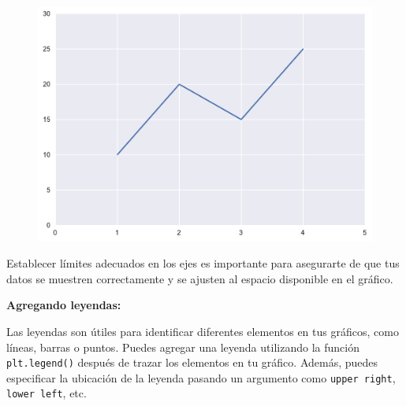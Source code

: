 \documentclass[
  a4paper,
]{article}
\begin{document}
\begin{figure}[H]

{\centering \includegraphics{index_files/figure-pdf/cell-11-output-1.pdf}

}

\end{figure}

Establecer límites adecuados en los ejes es importante para asegurarte
de que tus datos se muestren correctamente y se ajusten al espacio
disponible en el gráfico.

\textbf{Agregando leyendas:}

Las leyendas son útiles para identificar diferentes elementos en tus
gráficos, como líneas, barras o puntos. Puedes agregar una leyenda
utilizando la función \texttt{plt.legend()} después de trazar los
elementos en tu gráfico. Además, puedes especificar la ubicación de la
leyenda pasando un argumento como
\texttt{\textquotesingle{}upper\ right\textquotesingle{}},
\texttt{\textquotesingle{}lower\ left\textquotesingle{}}, etc.
\end{document}
